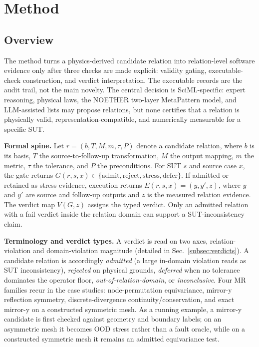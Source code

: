 \documentclass[preprint,12pt,authoryear]{elsarticle}
\begin{document}
\section{Method}
\label{sec:method}

\subsection{Overview}
\label{subsec:method-overview}

The method turns a physics-derived candidate relation into relation-level
software evidence only after three checks are made explicit: validity gating,
executable-check construction, and verdict interpretation. The executable
records are the audit trail, not the main novelty. The central decision is
SciML-specific: expert reasoning, physical laws, the NOETHER two-layer
MetaPattern model, and LLM-assisted lists may propose relations, but none
certifies that a relation is physically valid, representation-compatible, and
numerically measurable for a specific SUT.

\textbf{Formal spine.} Let \(r=(b,T,M,m,\tau,P)\) denote a candidate relation, where \(b\) is its basis, \(T\) the source-to-follow-up transformation, \(M\) the output mapping, \(m\) the metric, \(\tau\) the tolerance, and \(P\) the preconditions. For SUT \(s\) and source case \(x\), the gate returns \(G(r,s,x)\in\{\mathrm{admit},\mathrm{reject},\mathrm{stress},\mathrm{defer}\}\). If admitted or retained as stress evidence, execution returns \(E(r,s,x)=(y,y',z)\), where \(y\) and \(y'\) are source and follow-up outputs and \(z\) is the measured relation evidence. The verdict map \(V(G,z)\) assigns the typed verdict. Only an admitted relation with a fail verdict inside the relation domain can support a SUT-inconsistency claim.

\textbf{Terminology and verdict types.} A verdict is read on two axes, relation-violation and domain-violation magnitude (detailed in Sec.~\ref{subsec:verdicts}). A candidate relation is accordingly \emph{admitted} (a large in-domain violation reads as SUT inconsistency), \emph{rejected} on physical grounds, \emph{deferred} when no tolerance dominates the operator floor, \emph{out-of-relation-domain}, or \emph{inconclusive}. Four MR families recur in the case studies: node-permutation equivariance, mirror-y reflection symmetry, discrete-divergence continuity/conservation, and exact mirror-y on a constructed symmetric mesh. As a running example, a mirror-y candidate is first checked against geometry and boundary labels; on an asymmetric mesh it becomes OOD stress rather than a fault oracle, while on a constructed symmetric mesh it remains an admitted equivariance test.
\end{document}

